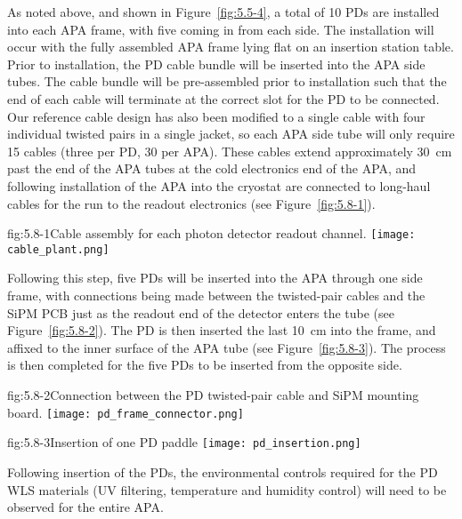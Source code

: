 As noted above, and shown in Figure~\ref{fig:5.5-4}, a total of 10 PDs are
installed into each APA frame, with five coming in from each side.  The
installation will occur with the fully assembled APA frame lying flat
on an insertion station table.  Prior to installation, the PD cable
bundle will be inserted into the APA side tubes.  The cable bundle
will be pre-assembled prior to installation such that the end of each
cable will terminate at the correct slot for the PD to be connected.
Our reference cable design has also been modified to a single cable
with four individual twisted pairs in a single jacket, so each APA side
tube will only require 15 cables (three per PD, 30 per APA).  These cables
extend approximately 30~cm past the end of the APA tubes at the cold
electronics end of the APA, and following installation of the APA into
the cryostat are connected to long-haul cables for the run to the
readout electronics (see Figure~\ref{fig:5.8-1}).

\begin{cdrfigure}{fig:5.8-1}{Cable assembly for each photon detector
    readout channel.}  
  \texttt{[image: cable\_plant.png]}
\end{cdrfigure}

Following this step, five PDs will be inserted into the APA through one
side frame, with connections being made between the twisted-pair
cables and the SiPM PCB just as the readout end of the detector enters
the tube (see Figure~\ref{fig:5.8-2}).  The PD is then inserted the last 10~cm into
the frame, and affixed to the inner surface of the APA tube (see
Figure~\ref{fig:5.8-3}).  The process is then completed for the five PDs to be
inserted from the opposite side.

\begin{cdrfigure}{fig:5.8-2}{Connection between the PD twisted-pair cable and SiPM mounting board.}
  \texttt{[image: pd\_frame\_connector.png]}
\end{cdrfigure}

\begin{cdrfigure}{fig:5.8-3}{Insertion of one PD paddle}
  \texttt{[image: pd\_insertion.png]} 
\end{cdrfigure}

Following insertion of the PDs, the environmental controls required
for the PD WLS materials (UV filtering, temperature and humidity
control) will need to be observed for the entire APA.






